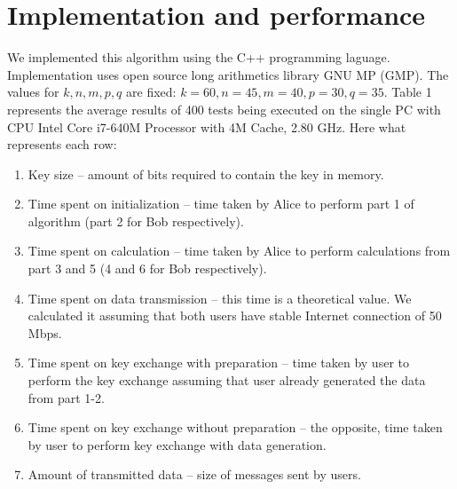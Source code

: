 \section{Implementation and performance}
	We implemented this algorithm using the C++ programming laguage. Implementation uses open source long arithmetics library GNU MP (GMP). The values for $ k, n, m, p, q $ are fixed: $ k = 60, n = 45, m = 40, p = 30, q = 35 $. Table 1 represents the average results of 400 tests being executed on the single PC with CPU Intel Core i7-640M Processor with 4M Cache, 2.80 GHz. Here what represents each row:
	\begin{enumerate}
		\item Key size -- amount of bits required to contain the key in memory. 
		\item Time spent on initialization -- time taken by Alice to perform part 1 of algorithm (part 2 for Bob respectively).
		\item Time spent on calculation -- time taken by Alice to perform calculations from part 3 and 5 (4 and 6 for Bob respectively).
		\item Time spent on data transmission -- this time is a theoretical value. We calculated it assuming that both users have stable Internet connection of 50 Mbps.
		\item Time spent on key exchange with preparation -- time taken by user to perform the key exchange assuming that user already generated the data from part 1-2. 
		\item Time spent on key exchange without preparation -- the opposite, time taken by user to perform key exchange with data generation.
		\item Amount of transmitted data -- size of messages sent by users. 
	\end{enumerate}
	